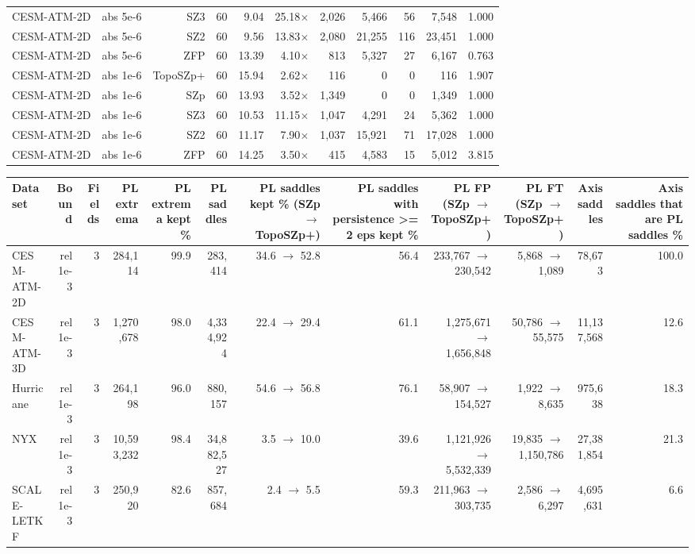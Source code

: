 \begin{tabular}{lrrrrrrrrrr}
CESM-ATM-2D & abs 5e-6 & SZ3 & 60 & 9.04 & 25.18$\times$ & 2,026 & 5,466 & 56 & 7,548 & 1.000 \\
CESM-ATM-2D & abs 5e-6 & SZ2 & 60 & 9.56 & 13.83$\times$ & 2,080 & 21,255 & 116 & 23,451 & 1.000 \\
CESM-ATM-2D & abs 5e-6 & ZFP & 60 & 13.39 & 4.10$\times$ & 813 & 5,327 & 27 & 6,167 & 0.763 \\
CESM-ATM-2D & abs 1e-6 & TopoSZp+ & 60 & 15.94 & 2.62$\times$ & 116 & 0 & 0 & 116 & 1.907 \\
CESM-ATM-2D & abs 1e-6 & SZp & 60 & 13.93 & 3.52$\times$ & 1,349 & 0 & 0 & 1,349 & 1.000 \\
CESM-ATM-2D & abs 1e-6 & SZ3 & 60 & 10.53 & 11.15$\times$ & 1,047 & 4,291 & 24 & 5,362 & 1.000 \\
CESM-ATM-2D & abs 1e-6 & SZ2 & 60 & 11.17 & 7.90$\times$ & 1,037 & 15,921 & 71 & 17,028 & 1.000 \\
CESM-ATM-2D & abs 1e-6 & ZFP & 60 & 14.25 & 3.50$\times$ & 415 & 4,583 & 15 & 5,012 & 3.815 \\
\bottomrule
\end{tabular}

\begin{tabular}{lrrrrrrrrrrr}
\toprule
\textbf{Dataset} & \textbf{Bound} & \textbf{Fields} & \textbf{PL extrema} & \textbf{PL extrema kept \%} & \textbf{PL saddles} & \textbf{PL saddles kept \% (SZp $\to$ TopoSZp+)} & \textbf{PL saddles with persistence >= 2 eps kept \%} & \textbf{PL FP (SZp $\to$ TopoSZp+)} & \textbf{PL FT (SZp $\to$ TopoSZp+)} & \textbf{Axis saddles} & \textbf{Axis saddles that are PL saddles \%} \\
\midrule
CESM-ATM-2D & rel 1e-3 & 3 & 284,114 & 99.9 & 283,414 & 34.6 $\to$ 52.8 & 56.4 & 233,767 $\to$ 230,542 & 5,868 $\to$ 1,089 & 78,673 & 100.0 \\
CESM-ATM-3D & rel 1e-3 & 3 & 1,270,678 & 98.0 & 4,334,924 & 22.4 $\to$ 29.4 & 61.1 & 1,275,671 $\to$ 1,656,848 & 50,786 $\to$ 55,575 & 11,137,568 & 12.6 \\
Hurricane & rel 1e-3 & 3 & 264,198 & 96.0 & 880,157 & 54.6 $\to$ 56.8 & 76.1 & 58,907 $\to$ 154,527 & 1,922 $\to$ 8,635 & 975,638 & 18.3 \\
NYX & rel 1e-3 & 3 & 10,593,232 & 98.4 & 34,882,527 & 3.5 $\to$ 10.0 & 39.6 & 1,121,926 $\to$ 5,532,339 & 19,835 $\to$ 1,150,786 & 27,381,854 & 21.3 \\
SCALE-LETKF & rel 1e-3 & 3 & 250,920 & 82.6 & 857,684 & 2.4 $\to$ 5.5 & 59.3 & 211,963 $\to$ 303,735 & 2,586 $\to$ 6,297 & 4,695,631 & 6.6 \\
\bottomrule
\end{tabular}

